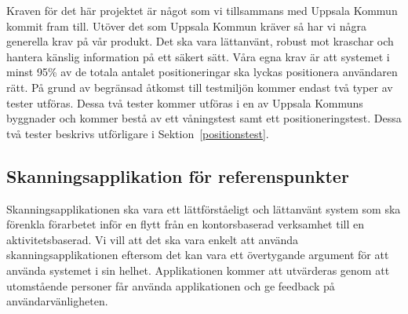 \documentclass[a4paper,12pt]{article}
\begin{document}

 Kraven för det här projektet är något som vi tillsammans med Uppsala Kommun kommit fram till. Utöver det som Uppsala Kommun kräver så har vi några generella krav på vår produkt. Det ska vara lättanvänt, robust mot kraschar och hantera känslig information på ett säkert sätt. Våra egna krav är att systemet i minst 95\% av de totala antalet positioneringar ska lyckas positionera användaren rätt. På grund av begränsad åtkomst till testmiljön kommer endast två typer av tester utföras. Dessa två tester kommer utföras i en av Uppsala Kommuns byggnader och kommer bestå av ett våningstest samt ett positioneringstest. Dessa två tester beskrivs utförligare i Sektion~\ref{positionstest}.

 \subsection{Skanningsapplikation för referenspunkter}
 Skanningsapplikationen ska vara ett lättförståeligt och lättanvänt system som ska förenkla förarbetet inför en flytt från en kontorsbaserad verksamhet till en aktivitetsbaserad. Vi vill att det ska vara enkelt att använda skanningsapplikationen eftersom det kan vara ett övertygande argument för att använda systemet i sin helhet. Applikationen kommer att utvärderas genom att utomstående personer får använda applikationen och ge feedback på användarvänligheten.
\end{document}
